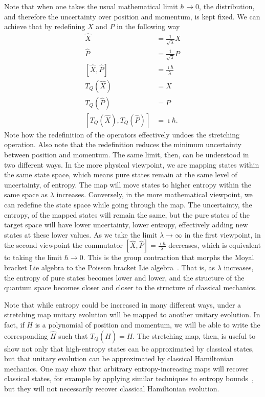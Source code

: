 \documentclass{article}
\begin{document}
Note that when one takes the usual mathematical limit $\hbar \to 0$, the distribution, and therefore the uncertainty over position and momentum, is kept fixed. We can achieve that by redefining $X$ and $P$ in the following way
\begin{align}
    \hat{X} &= \frac{1}{\sqrt{\lambda}} X \\
    \hat{P} &= \frac{1}{\sqrt{\lambda}} P \\
    [\hat{X}, \hat{P}] &= \frac{\imath \hbar}{\lambda} \\
    T_Q(\hat{X}) &=  X \\
    T_Q(\hat{P}) &=  P \\
    [T_Q(\hat{X}), T_Q(\hat{P})] &= \imath \hbar.
\end{align}
Note how the redefinition of the operators effectively undoes the stretching operation. Also note that the redefinition reduces the minimum uncertainty between position and momentum. The same limit, then, can be understood in two different ways. In the more physical viewpoint, we are mapping states within the same state space, which means pure states remain at the same level of uncertainty, of entropy. The map will move states to higher entropy within the same space as $\lambda$ increases. Conversely, in the more mathematical viewpoint, we can redefine the state space while going through the map. The uncertainty, the entropy, of the mapped states will remain the same, but the pure states of the target space will have lower  uncertainty, lower entropy, effectively adding new states at these lower values. As we take the limit $\lambda \to \infty$ in the first viewpoint, in the second viewpoint the commutator $[\hat{X},\hat{P}] = \frac{\imath \hbar}{\lambda}$ decreases, which is equivalent to taking the limit $\hbar \to 0$. This is the group contraction that morphs the Moyal bracket Lie algebra to the Poisson bracket Lie algebra~\cite{Moyal_1949,saletan1961contraction, inonu1953contraction}. That is, as $\lambda$ increases, the entropy of pure states becomes lower and lower, and the structure of the quantum space becomes closer and closer to the structure of classical mechanics.

Note that while entropy could be increased in many different ways, under a stretching map unitary evolution will be mapped to another unitary evolution. In fact, if $H$ is a polynomial of position and momentum, we will be able to write the corresponding $\hat{H}$ such that $T_Q(\hat{H}) = H$. The stretching map, then, is useful to show not only that high-entropy states can be approximated by classical states, but that unitary evolution can be approximated by classical Hamiltonian mechanics. One may show that arbitrary entropy-increasing maps will recover classical states, for example by applying similar techniques to entropy bounds~\cite{Hall_2018}, but they will not necessarily recover classical Hamiltonian evolution.
\end{document}
